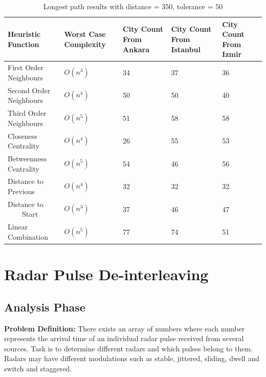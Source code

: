 \documentclass[12pt]{report}
\begin{document}
            \begin{table}[H]
                \centering
                \begin{tabular}{|P{3.5cm}|P{3cm}|P{3cm}|P{3cm}|P{3cm}|}
                \hline
                    \textbf{Heuristic Function} & \textbf{Worst Case Complexity} & \textbf{City Count From Ankara} & \textbf{City Count From Istanbul} & \textbf{City Count From Izmir} \\ \hline
                    First Order Neighbours & $O(n^3)$ & 34 & 37 & 36 \\ \hline
                    Second Order Neighbours & $O(n^4)$ & 50 & 50 & 40 \\ \hline
                    Third Order Neighbours & $O(n^5)$ & 51 & 58 & 58 \\ \hline
                    Closeness Centrality & $O(n^4)$ & 26 & 55 & 53 \\ \hline
                    Betweenness Centrality & $O(n^5)$ & 54 & 46 & 56 \\ \hline
                    Distance to Previous & $O(n^4)$ & 32 & 32 & 32 \\ \hline
                    Distance to \ \ \ \ Start & $O(n^3)$ & 37 & 46 & 47 \\ \hline
                    Linear Combination & $O(n^5)$ & 77 & 74 & 51 \\ \hline
                \end{tabular}
                \caption{Longest path results with distance = 350, tolerance = 50}
            \end{table}
            
    \section{Radar Pulse De-interleaving}
        \subsection{Analysis Phase}
            \textbf{Problem Definition:} There exists an array of numbers where each number represents the arrival time of an individual radar pulse received from several sources. Task is to
            determine different radars and which pulses belong to them. Radars may have different modulations such as stable, jittered, sliding, dwell and switch and staggered.
\end{document}
